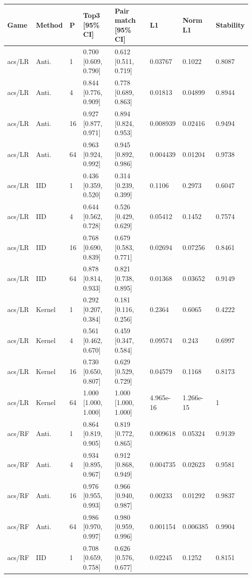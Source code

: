 \begingroup\footnotesize\setlength{\tabcolsep}{3pt}
\begin{tabular}{llllllll}
\toprule
Game & Method & P & Top3 [95\% CI] & Pair match [95\% CI] & L1 & Norm L1 & Stability \\
\midrule
acs/LR & Anti. & 1 & 0.700 [0.609, 0.790] & 0.612 [0.511, 0.719] & 0.03767 & 0.1022 & 0.8087 \\
acs/LR & Anti. & 4 & 0.844 [0.776, 0.909] & 0.778 [0.689, 0.863] & 0.01813 & 0.04899 & 0.8944 \\
acs/LR & Anti. & 16 & 0.927 [0.877, 0.971] & 0.894 [0.824, 0.953] & 0.008939 & 0.02416 & 0.9494 \\
acs/LR & Anti. & 64 & 0.963 [0.924, 0.992] & 0.945 [0.892, 0.986] & 0.004439 & 0.01204 & 0.9738 \\
acs/LR & IID & 1 & 0.436 [0.359, 0.520] & 0.314 [0.239, 0.399] & 0.1106 & 0.2973 & 0.6047 \\
acs/LR & IID & 4 & 0.644 [0.562, 0.728] & 0.526 [0.429, 0.629] & 0.05412 & 0.1452 & 0.7574 \\
acs/LR & IID & 16 & 0.768 [0.690, 0.839] & 0.679 [0.583, 0.771] & 0.02694 & 0.07256 & 0.8461 \\
acs/LR & IID & 64 & 0.878 [0.814, 0.933] & 0.821 [0.738, 0.895] & 0.01368 & 0.03652 & 0.9149 \\
acs/LR & Kernel & 1 & 0.292 [0.207, 0.384] & 0.181 [0.116, 0.256] & 0.2364 & 0.6065 & 0.4222 \\
acs/LR & Kernel & 4 & 0.561 [0.462, 0.670] & 0.459 [0.347, 0.584] & 0.09574 & 0.243 & 0.6997 \\
acs/LR & Kernel & 16 & 0.730 [0.650, 0.807] & 0.629 [0.529, 0.729] & 0.04579 & 0.1168 & 0.8173 \\
acs/LR & Kernel & 64 & 1.000 [1.000, 1.000] & 1.000 [1.000, 1.000] & 4.965e-16 & 1.266e-15 & 1 \\
acs/RF & Anti. & 1 & 0.864 [0.819, 0.905] & 0.819 [0.772, 0.865] & 0.009618 & 0.05324 & 0.9139 \\
acs/RF & Anti. & 4 & 0.934 [0.895, 0.967] & 0.912 [0.868, 0.949] & 0.004735 & 0.02623 & 0.9581 \\
acs/RF & Anti. & 16 & 0.976 [0.955, 0.993] & 0.966 [0.940, 0.987] & 0.00233 & 0.01292 & 0.9837 \\
acs/RF & Anti. & 64 & 0.986 [0.970, 0.997] & 0.980 [0.959, 0.996] & 0.001154 & 0.006385 & 0.9904 \\
acs/RF & IID & 1 & 0.708 [0.659, 0.758] & 0.626 [0.576, 0.677] & 0.02245 & 0.1252 & 0.8151 \\

\end{tabular}
